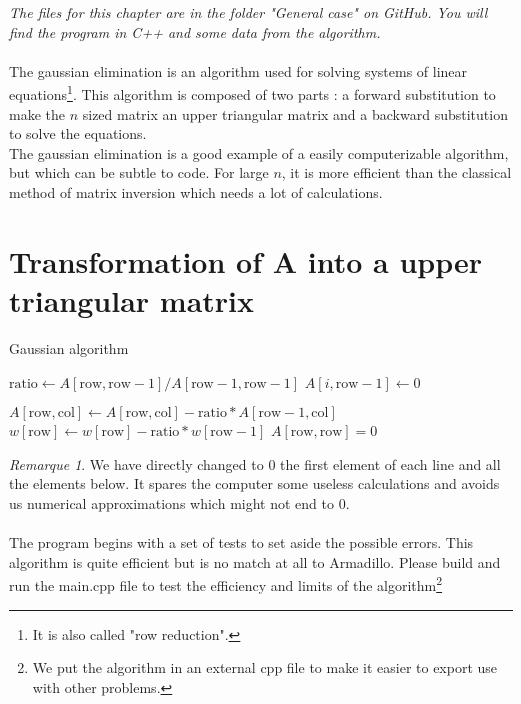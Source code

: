 \documentclass[a4paper, twoside, 11pt]{report}
\theoremstyle{theorem}
\theoremstyle{remark}
\newtheorem{remark}{Remarque}[chapter]
\theoremstyle{exemple}
\begin{document}
	\footnotesize{\itshape{The files for this chapter are in the folder "General case" on GitHub. You will find the program in C++ and some data from the algorithm.}}

\normalsize
	\paragraph{}The gaussian elimination is an algorithm used for solving systems of linear equations\footnote{It is also called "row reduction".}. This algorithm is composed of two parts : a forward substitution to make the $n$ sized matrix an upper triangular matrix and a backward substitution to solve the equations.
	\\The gaussian elimination is a good example of a easily computerizable algorithm, but which can be subtle to code. For large $n$, it is more efficient than the classical method of matrix inversion which needs a lot of calculations.
	
		\section{Transformation of A into a upper triangular matrix}					
			\caption{Gaussian algorithm}
			\begin{algorithmic}[1]
					\State $\text{ratio} \gets A[\text{row}, \text{row}-1] / A[\text{row}-1, \text{row}-1]$
						\State $A[i,\text{row}-1] \gets 0$
					\EndFor
					
						\State $A[\text{row}, \text{col}] \gets A[\text{row}, \text{col}] - \text{ratio} * A[\text{row} - 1 , \text{col}]$
					\EndFor
					\State $w[\text{row}] \gets w[\text{row}] - \text{ratio} * w[\text{row} - 1]$
					\If $A[\text{row} , \text{row}] = 0$
						\State {}
					\EndIf
				\EndFor
			\end{algorithmic}
	

\begin{remark}We have directly changed to $0$ the first element of each line and all the elements below. It spares the computer some useless calculations and avoids us numerical approximations which might not end to $0$. \end{remark}
	
\paragraph{}The program begins with a set of tests to set aside the possible errors. This algorithm is quite efficient but is no match at all to Armadillo. Please build and run the main.cpp file to test the efficiency and limits of the algorithm\footnote{We put the algorithm in an external cpp file to make it easier to export use with other problems.}
	
\end{document}
